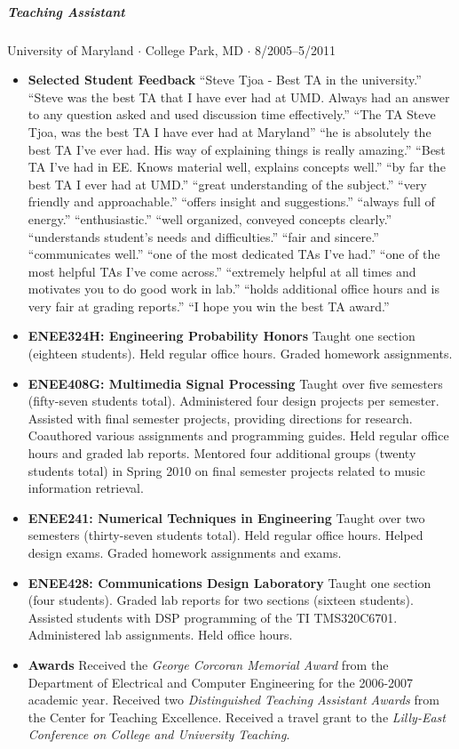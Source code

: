 \documentclass[10pt,letterpaper]{article}
\begin{document}
\subparagraph{Teaching Assistant}
University of Maryland $\cdot$ College Park, MD $\cdot$ 8/2005--5/2011
\begin{itemize}
    \item \textbf{Selected Student Feedback}  ``Steve Tjoa - Best TA in the university.'' ``Steve was the best TA that I have ever had at UMD. Always had an answer to any question asked and used discussion time effectively.'' ``The TA Steve Tjoa, was the best TA I have ever had at Maryland'' ``he is absolutely the best TA I've ever had. His way of explaining things is really amazing.'' ``Best TA I've had in EE. Knows material well, explains concepts well.'' ``by far the best TA I ever had at UMD.''  ``great understanding of the subject.'' ``very friendly and approachable.'' ``offers insight and suggestions.'' ``always full of energy.''  ``enthusiastic.'' ``well organized, conveyed concepts clearly.'' ``understands student's needs and difficulties.'' ``fair and sincere.'' ``communicates well.'' ``one of the most dedicated TAs I've had.'' ``one of the most helpful TAs I've come across.'' ``extremely helpful at all times and motivates you to do good work in lab.'' ``holds additional office hours and is very fair at grading reports.'' ``I hope you win the best TA award.''
    \item \textbf{ENEE324H: Engineering Probability Honors}  Taught one section (eighteen students). Held regular office hours. Graded homework assignments.
    \item \textbf{ENEE408G: Multimedia Signal Processing} Taught over five semesters (fifty-seven students total). Administered four design projects per semester. Assisted with final semester projects, providing directions for research. Coauthored various assignments and programming guides. Held regular office hours and graded lab reports. Mentored four additional groups (twenty students total) in Spring 2010 on final semester projects related to music information retrieval.
    \item \textbf{ENEE241: Numerical Techniques in Engineering} Taught over two semesters (thirty-seven students total). Held regular office hours. Helped design exams. Graded homework assignments and exams.
    \item \textbf{ENEE428: Communications Design Laboratory} Taught one section (four students). Graded lab reports for two sections (sixteen students). Assisted students with DSP programming of the TI TMS320C6701. Administered lab assignments. Held office hours.
    \item \textbf{Awards} Received the \textit{George Corcoran Memorial Award} from the Department of Electrical and Computer Engineering for the 2006-2007 academic year.  Received two \textit{Distinguished Teaching Assistant Awards} from the Center for Teaching Excellence.  Received a travel grant to the \textit{Lilly-East Conference on College and University Teaching}.
\end{itemize}
\end{document}
